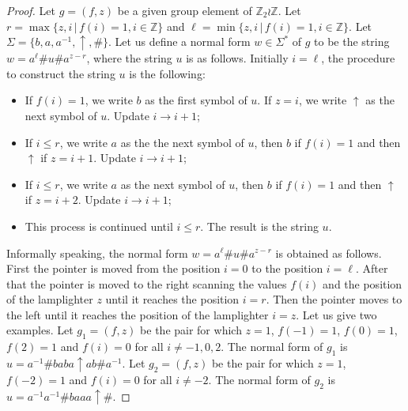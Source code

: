 \documentclass[article,12pt]{elsarticle}
\begin{document}
\begin{proof}
 	 Let $g = (f,z)$ be a given group 
 	 element of $\mathbb{Z}_2 \wr \mathbb{Z}$. 
 	 Let $r = \max \{z,i \, | \, f(i)=1, i \in \mathbb{Z}\}$  
 	 and $\ell = \min \{z, i \, | \, f(i) = 1, 
 	 i \in \mathbb{Z} \}$.   
 	 Let $\Sigma  = \{b,a,a^{-1},\uparrow,\#\}$. 
 	 Let us define a normal form $w \in \Sigma^*$ of 
 	 $g$ to be the string $w = a^{\ell} \# u \# a^{z-r}$, 
 	 where the string $u$ is as follows. 
 	 Initially $i=\ell$, the procedure to construct  
 	 the string $u$ is the following: 
 	 \begin{itemize} 
 	 	\item{If $f(i)= 1$, we write $b$ as 
 	 		the first symbol of $u$. 
 	 		If $z = i$, we write $\uparrow$ 
 	 		as the next symbol of $u$. 
 	 		Update $i \rightarrow i+1$;}
 	 	\item{If $i \leqslant  r$, we write 
 	 		$a$ as the the next symbol of $u$, then 
 	 		$b$ if $f(i)=1$ and then $\uparrow$ if
 	 		$z = i+1$. Update $i \rightarrow i+1$;}
 	 	\item{If $i \leqslant r$, we write 
 	 		$a$ as the next symbol of $u$, then 
 	 		$b$ if $f(i)=1$ and then $\uparrow$ if
 	 		$z = i + 2$. Update $i \rightarrow i+1$;}
 	 	\item{This process is continued until 
 	 		$i \leqslant r$. The result is 
 	 		the string $u$.}
 	 \end{itemize} 	
 	 
 	 Informally speaking, the normal form 
 	 $w = a^{\ell} \# u \# a^{z-r}$ 
 	 is obtained as follows. First the pointer
 	 is moved from the position $i=0$ to the position $i=\ell$.
 	 After that the pointer is moved to the right 
 	 scanning the values $f(i)$ 
 	 and the position of the lamplighter 
 	 $z$ until it reaches the position $i = r$. 
 	 Then the pointer moves to the left 
 	 until it reaches the position of the lamplighter $i=z$.  
 	 Let us give two examples. Let $g_1 = (f,z)$ be the pair 
 	 for which $z=1$, $f(-1)=1$, $f(0)=1$, $f(2) = 1$
 	 and $f(i)=0$ for all $i \neq -1,0,2$. The normal 
 	 form of $g_1$ is $u=a^{-1}\#baba\uparrow ab\#a^{-1}$.  
 	 Let $g_2 = (f,z)$ be the pair 
 	 for which $z=1$, $f(-2)=1$
 	 and $f(i)=0$ for all $i \neq -2$. The normal 
 	 form of $g_2$ is $u=a^{-1}a^{-1}\#baaa\uparrow\#$.
 	 

\end{proof}
\end{document}
